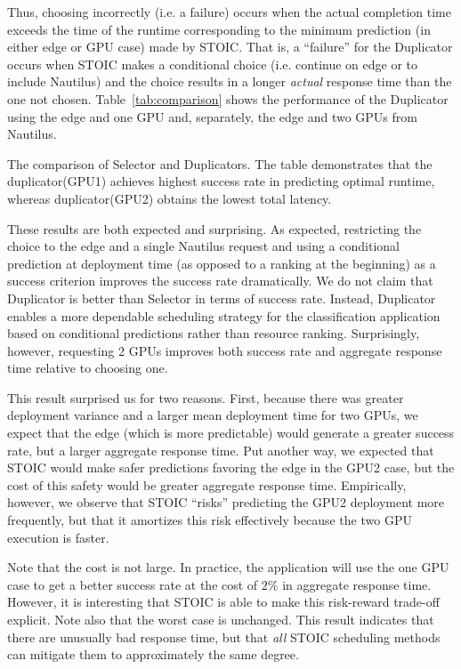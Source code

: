 Thus, choosing incorrectly (i.e. a failure) occurs when the actual completion time exceeds the time of the runtime corresponding to the minimum prediction (in either edge or GPU case) made by STOIC. That is, a ``failure'' for the Duplicator occurs when STOIC makes a conditional choice (i.e. continue on edge or to include Nautilus) and the choice results in a longer \textit{actual} response time than the one not chosen. Table~\ref{tab:comparison} shows the performance of the Duplicator using the edge and one GPU and, separately, the edge and two GPUs from Nautilus. 


\begin{table}[t] 
\centering
\resizebox{370pt}{!}{

}
\caption{
The comparison of Selector and Duplicators. The table demonstrates that the duplicator(GPU1) achieves highest success rate in predicting optimal runtime, whereas duplicator(GPU2) obtains the lowest total latency.}
\label{tab:comparison}
\end{table}

These results are both expected and surprising. As expected, restricting the choice to the edge and a single Nautilus request and using a conditional prediction at deployment time (as opposed to a ranking at the beginning) as a success criterion improves the success rate dramatically. We do not claim that Duplicator is better than Selector in terms of success rate. Instead, Duplicator enables a more dependable scheduling strategy for the classification application based on conditional predictions rather than resource ranking. Surprisingly, however, requesting 2 GPUs improves both success rate and aggregate response time relative to choosing one.

This result surprised us for two reasons. First, because there was greater deployment variance and a larger mean deployment time for two GPUs, we expect that the edge (which is more predictable) would generate a greater success rate, but a larger aggregate response time. Put another way, we expected that STOIC would make safer predictions favoring the edge in the GPU2 case, but the cost of this safety would be greater aggregate response time. Empirically, however, we observe that STOIC ``risks'' predicting the GPU2 deployment more frequently, but that it amortizes this risk effectively because the two GPU execution is faster.

Note that the cost is not large. In practice, the application
will use the one GPU case to get a better success rate at the cost of $2\%$ in aggregate response time.  However, it is interesting that STOIC is able to make this risk-reward trade-off explicit. Note also that the worst case is unchanged. This result indicates that there are unusually bad response time, but that \textit{all} STOIC scheduling methods can mitigate them to approximately the same degree.

